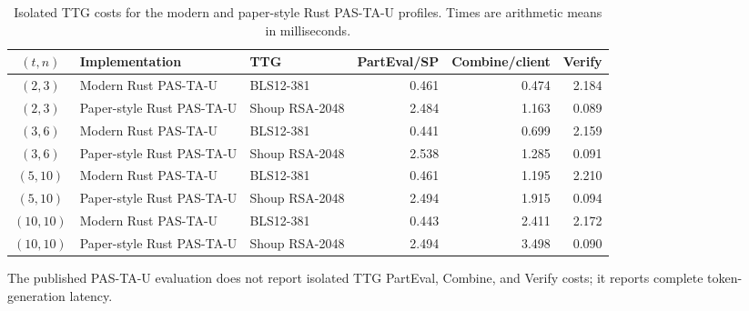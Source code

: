 \begin{table}[t]
\centering
\caption{Isolated TTG costs for the modern and paper-style Rust PAS-TA-U profiles. Times are arithmetic means in milliseconds.}
\label{tab:pastau-ttg-profiles}
\begin{tabular}{c l l r r r}
\toprule
$(t,n)$ & Implementation & TTG & PartEval/SP & Combine/client & Verify \\
\midrule
$(2,3)$ & Modern Rust PAS-TA-U & BLS12-381 & 0.461 & 0.474 & 2.184 \\
$(2,3)$ & Paper-style Rust PAS-TA-U & Shoup RSA-2048 & 2.484 & 1.163 & 0.089 \\
$(3,6)$ & Modern Rust PAS-TA-U & BLS12-381 & 0.441 & 0.699 & 2.159 \\
$(3,6)$ & Paper-style Rust PAS-TA-U & Shoup RSA-2048 & 2.538 & 1.285 & 0.091 \\
$(5,10)$ & Modern Rust PAS-TA-U & BLS12-381 & 0.461 & 1.195 & 2.210 \\
$(5,10)$ & Paper-style Rust PAS-TA-U & Shoup RSA-2048 & 2.494 & 1.915 & 0.094 \\
$(10,10)$ & Modern Rust PAS-TA-U & BLS12-381 & 0.443 & 2.411 & 2.172 \\
$(10,10)$ & Paper-style Rust PAS-TA-U & Shoup RSA-2048 & 2.494 & 3.498 & 0.090 \\
\bottomrule
\end{tabular}
\begin{minipage}{0.96\linewidth}\footnotesize
The published PAS-TA-U evaluation does not report isolated TTG PartEval, Combine, and Verify costs; it reports complete token-generation latency.
\end{minipage}
\end{table}
